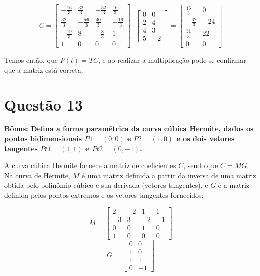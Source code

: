 \documentclass[12pt]{article}
\begin{document}
\begin{equation*}
    \renewcommand\arraystretch{2}
    C =
    \begin{bmatrix}
    -\frac{16}{3} & \frac{32}{3} & -\frac{32}{3} & \frac{16}{3}\\ 
    \frac{32}{3} & -\frac{56}{3} & \frac{40}{3} & -\frac{16}{3}\\
    -\frac{19}{3} & 8 &-\frac{8}{3} & 1\\
    1 & 0 & 0 & 0
    \end{bmatrix}
    \cdot
    \begin{bmatrix}
    0 & 0 \\
    2 & 4 \\
    4 & 3 \\
    5 & -2
    \end{bmatrix}
    =
    \begin{bmatrix}
    \frac{16}{3} & 0\\
    -\frac{32}{3} & -24\\
    \frac{31}{3} & 22\\
    0 & 0
    \end{bmatrix}
\end{equation*}{}

Temos então, que $P\left(t\right) = TC$, e ao realizar a multiplicação pode-se confirmar que a matriz está correta.

\section*{Questão 13}
{\bfseries Bônus: Defina a forma paramétrica da curva cúbica Hermite, dados os pontos bidimensionais $P1 = (0,0)$ e $P2 = (1,0)$ e os dois vetores tangentes $Pt1 = (1, 1)$ e $Pt2 = (0, -1)$.}

A curva cúbica Hermite fornece a matriz de coeficientes $C$, sendo que $C=MG$. Na curva de Hermite, $M$ é uma matriz definida a partir da inversa de uma matriz obtida pelo polinômio cúbico e sua derivada (vetores tangentes), e $G$ é a matriz definida pelos pontos extremos e os vetores tangentes fornecidos:

\begin{equation*}
    M = 
    \begin{bmatrix}
    2 & -2 & 1 & 1 \\
    -3 & 3 & -2 & -1\\
    0 & 0 & 1 & 0\\
    1 & 0 & 0 & 0
    \end{bmatrix}
\end{equation*}
\begin{equation*}
    G =
    \begin{bmatrix}
    0 & 0 \\
    1 & 0 \\
    1 & 1 \\
    0 & -1
    \end{bmatrix}
\end{equation*}
\end{document}
